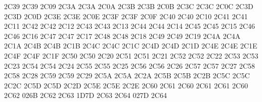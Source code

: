 \setcclcucx 2C39 2C39 2C09 %
\setcclcucx 2C3A 2C3A 2C0A %
\setcclcucx 2C3B 2C3B 2C0B %
\setcclcucx 2C3C 2C3C 2C0C %
\setcclcucx 2C3D 2C3D 2C0D %
\setcclcucx 2C3E 2C3E 2C0E %
\setcclcucx 2C3F 2C3F 2C0F %
\setcclcucx 2C40 2C40 2C10 %
\setcclcucx 2C41 2C41 2C11 %
\setcclcucx 2C42 2C42 2C12 %
\setcclcucx 2C43 2C43 2C13 %
\setcclcucx 2C44 2C44 2C14 %
\setcclcucx 2C45 2C45 2C15 %
\setcclcucx 2C46 2C46 2C16 %
\setcclcucx 2C47 2C47 2C17 %
\setcclcucx 2C48 2C48 2C18 %
\setcclcucx 2C49 2C49 2C19 %
\setcclcucx 2C4A 2C4A 2C1A %
\setcclcucx 2C4B 2C4B 2C1B %
\setcclcucx 2C4C 2C4C 2C1C %
\setcclcucx 2C4D 2C4D 2C1D %
\setcclcucx 2C4E 2C4E 2C1E %
\setcclcucx 2C4F 2C4F 2C1F %
\setcclcucx 2C50 2C50 2C20 %
\setcclcucx 2C51 2C51 2C21 %
\setcclcucx 2C52 2C52 2C22 %
\setcclcucx 2C53 2C53 2C23 %
\setcclcucx 2C54 2C54 2C24 %
\setcclcucx 2C55 2C55 2C25 %
\setcclcucx 2C56 2C56 2C26 %
\setcclcucx 2C57 2C57 2C27 %
\setcclcucx 2C58 2C58 2C28 %
\setcclcucx 2C59 2C59 2C29 %
\setcclcucx 2C5A 2C5A 2C2A %
\setcclcucx 2C5B 2C5B 2C2B %
\setcclcucx 2C5C 2C5C 2C2C %
\setcclcucx 2C5D 2C5D 2C2D %
\setcclcucx 2C5E 2C5E 2C2E %
\setcclcucx 2C60 2C61 2C60 %
\setcclcucx 2C61 2C61 2C60 %
\setcclcucx 2C62 026B 2C62 %
\setcclcucx 2C63 1D7D 2C63 %
\setcclcucx 2C64 027D 2C64 %
